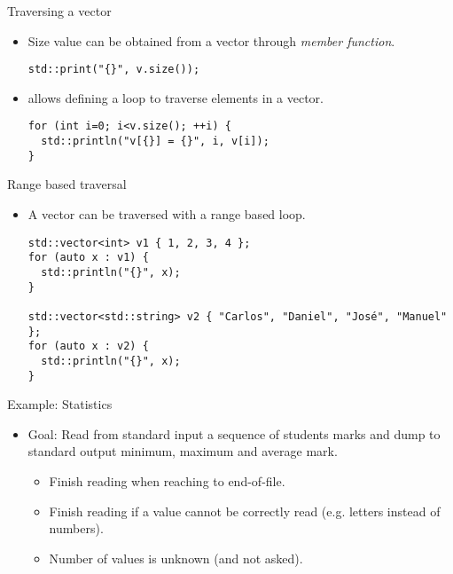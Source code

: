\begin{frame}[t,fragile]{Traversing a vector}
\begin{itemize}
  \item Size value can be obtained from a vector through  \emph{member function}.
\begin{lstlisting}
std::print("{}", v.size());
\end{lstlisting}

  \vfill
  \item {} allows defining a loop to traverse elements in a vector.
\begin{lstlisting}
for (int i=0; i<v.size(); ++i) {
  std::println("v[{}] = {}", i, v[i]);
}
\end{lstlisting}

\end{itemize}
\end{frame}

\begin{frame}[t,fragile]{Range based traversal}
\begin{itemize}
  \item A vector can be traversed with a range based loop.
\begin{lstlisting}
std::vector<int> v1 { 1, 2, 3, 4 };
for (auto x : v1) {
  std::println("{}", x);
}

std::vector<std::string> v2 { "Carlos", "Daniel", "José", "Manuel" };
for (auto x : v2) {
  std::println("{}", x);
}
\end{lstlisting}
\end{itemize}
\end{frame}

\begin{frame}[t]{Example: Statistics}
\begin{itemize}
  \item \alert{Goal}: Read from standard input a sequence of students marks
        and dump to standard output minimum, maximum and average mark.
    \begin{itemize}
      \item Finish reading when reaching to end-of-file.
      \item Finish reading if a value cannot be correctly read (e.g. letters instead of numbers).
      \item Number of values is unknown (and not asked).
    \end{itemize}
\end{itemize}
\end{frame}

